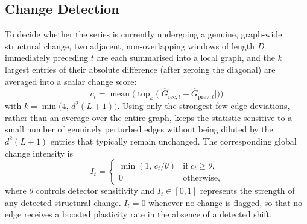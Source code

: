 \documentclass{ieeeaccess}
\newcommand{\Ghat}{\hat{G}}
\begin{document}
\subsection{Change Detection}
\label{sec:detect}
To decide whether the series is currently undergoing a genuine, graph-wide structural change, two adjacent, non-overlapping windows of length $D$ immediately preceding $t$ are each summarised into a local graph, and the $k$ largest entries of their absolute difference (after zeroing the diagonal) are averaged into a scalar change score:
\begin{equation}
c_t=\operatorname{mean}\bigl(\operatorname{top}_k\bigl(\lvert\Ghat_{\mathrm{rec},t}-\Ghat_{\mathrm{prev},t}\rvert\bigr)\bigr)
\label{eq:score}
\end{equation}
with $k=\min\bigl(4,\,d^2(L+1)\bigr)$. Using only the strongest few edge deviations, rather than an average over the entire graph, keeps the statistic sensitive to a small number of genuinely perturbed edges without being diluted by the $d^2(L+1)$ entries that typically remain unchanged. The corresponding global change intensity is
\begin{equation}
I_t=\begin{cases}\min(1,\,c_t/\theta) & \text{if } c_t\ge\theta,\\[2pt] 0 & \text{otherwise,}\end{cases}
\label{eq:intensity}
\end{equation}
where $\theta$ controls detector sensitivity and $I_t\in[0,1]$ represents the strength of any detected structural change. $I_t=0$ whenever no change is flagged, so that no edge receives a boosted plasticity rate in the absence of a detected shift.
\end{document}
